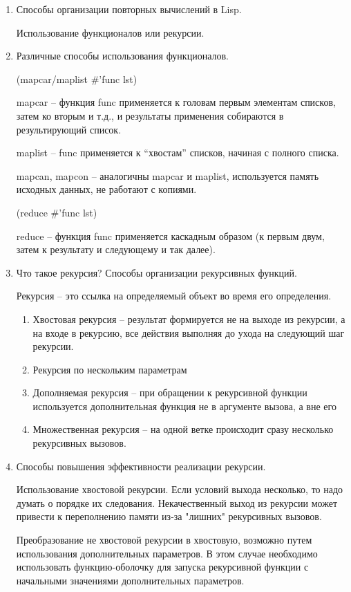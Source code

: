 \documentclass[a4paper,14pt]{extreport} %
\begin{document}
\begin{enumerate}
\item Способы организации повторных вычислений в Lisp. 

Использование функционалов или рекурсии. 

\item Различные способы использования функционалов. 

(mapcar/maplist $\#$'func lst)

mapcar -- функция func применяется к головам первым элементам списков, затем ко вторым и т.д., и результаты применения собираются в результирующий список.

maplist -- func применяется к “хвостам” списков, начиная с полного списка.

mapcan, mapcon -- аналогичны mapcar и maplist, используется память исходных данных, не работают с копиями.

(reduce $\#$’func lst)

reduce -- функция func применяется каскадным образом (к первым двум, затем к результату и следующему и так далее).

\item Что такое рекурсия? Способы организации рекурсивных функций. 

Рекурсия -- это ссылка на определяемый объект во время его определения. 

\begin{enumerate}
\item Хвостовая рекурсия -- результат формируется не на выходе из рекурсии, а на входе в рекурсию, все действия выполняя до ухода на следующий шаг рекурсии. 
\item Рекурсия по нескольким параметрам
\item Дополняемая рекурсия -- при обращении к рекурсивной функции используется дополнительная функция не в аргументе вызова, а вне его
\item Множественная рекурсия -- на одной ветке происходит сразу несколько рекурсивных вызовов.
\end{enumerate}

\item Способы повышения эффективности реализации рекурсии. 

Использование хвостовой рекурсии. Если условий выхода несколько, то надо думать о порядке их следования. Некачественный выход из рекурсии может привести к переполнению памяти из-за "лишних" рекурсивных вызовов. 

Преобразование не хвостовой рекурсии в хвостовую, возможно путем использования дополнительных параметров. В этом случае необходимо использовать функцию-оболочку для запуска рекурсивной функции с начальными значениями дополнительных параметров. 

\end{enumerate}
\end{document}
